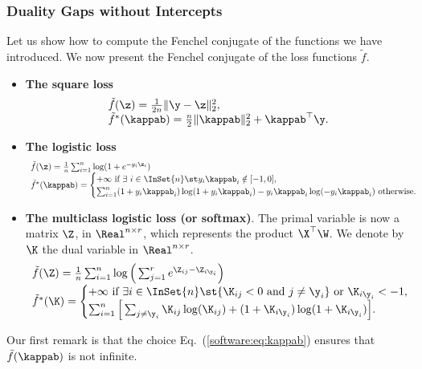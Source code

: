 \documentclass[a4paper, 11pt]{article}
\begin{document}
\subsubsection{Duality Gaps without Intercepts}
Let us show how to compute the Fenchel conjugate of the functions we have introduced.
We now present the Fenchel conjugate of the loss functions $\tilde{f}$.
\begin{itemize}
   \item \textbf{The square loss} 
      $$\begin{array}{l}
         \tilde{f}(\z)=\frac{1}{2n}\|\y-\z\|_2^2, \\
         \tilde{f}^\ast(\kappab)=\frac{n}{2}\|\kappab\|_2^2 + \kappab^\top\y.
      \end{array}
      $$
   \item \textbf{The logistic loss} 
      $$\begin{array}{l}
         \tilde{f}(\z)=\frac{1}{n}\sum_{i=1}^n \log(1+e^{-y_i\z_i}) \\
         \tilde{f}^\ast(\kappab)=\begin{cases}
            +\infty ~\text{if}~ \exists~i\in \InSet{n} \st y_i\kappab_i \notin [-1,0],\\
            \sum_{i=1}^n(1+y_i\kappab_i)\log(1+y_i\kappab_i)-y_i\kappab_i\log(-y_i\kappab_i) ~\text{otherwise}.
         \end{cases}
      \end{array}
      $$
   \item \textbf{The multiclass logistic loss (or softmax)}. The primal variable is now a matrix $\Z$, in $\Real^{n \times r}$, which represents the product $\X^\top \W$. We denote by $\K$ the dual variable in $\Real^{n \times r}$.
       $$\begin{array}{l}
          \tilde{f}(\Z)=\frac{1}{n}\sum_{i=1}^n \log\Big(\sum_{j=1}^r e^{ \Z_{ij} - \Z_{i\y_i}}\Big)  \\
          \tilde{f}^\ast(\K)=\begin{cases}
             +\infty ~\text{if}~ \exists i \in\InSet{n} \st \{ \K_{ij} < 0 ~\text{and}~ j \neq \y_i \} ~\text{or}~ \K_{i\y_i} < -1,\\
             \sum_{i=1}^n \Big[\sum_{j \neq \y_i}\K_{ij}\log(\K_{ij}) + (1+\K_{i \y_i})\log(1+\K_{i \y_i})\Big].
          \end{cases}
        \end{array}
       $$
\end{itemize}

Our first remark is that the choice Eq.~(\ref{software:eq:kappab}) ensures
that $\tilde{f}(\kappab)$ is not infinite.
\end{document}
